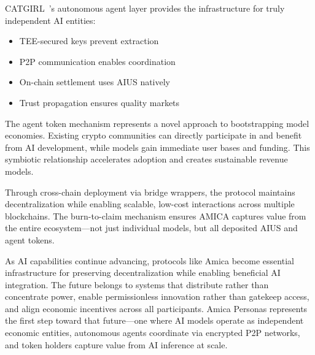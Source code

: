 \documentclass{article}
\begin{document}
CATGIRL~\cite{catgirl2025}'s autonomous agent layer provides the infrastructure for truly independent AI entities:
\begin{itemize}
    \item TEE-secured keys prevent extraction
    \item P2P communication enables coordination
    \item On-chain settlement uses AIUS natively
    \item Trust propagation ensures quality markets
\end{itemize}

The agent token mechanism represents a novel approach to bootstrapping model economies. Existing crypto communities can directly participate in and benefit from AI development, while models gain immediate user bases and funding. This symbiotic relationship accelerates adoption and creates sustainable revenue models.

Through cross-chain deployment via bridge wrappers, the protocol maintains decentralization while enabling scalable, low-cost interactions across multiple blockchains. The burn-to-claim mechanism ensures AMICA captures value from the entire ecosystem—not just individual models, but all deposited AIUS and agent tokens.

As AI capabilities continue advancing, protocols like Amica become essential infrastructure for preserving decentralization while enabling beneficial AI integration. The future belongs to systems that distribute rather than concentrate power, enable permissionless innovation rather than gatekeep access, and align economic incentives across all participants. Amica Personas represents the first step toward that future—one where AI models operate as independent economic entities, autonomous agents coordinate via encrypted P2P networks, and token holders capture value from AI inference at scale.
\end{document}
